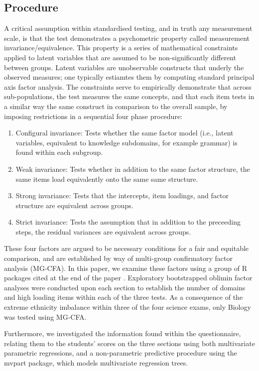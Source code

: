 \documentclass{article}\usepackage[]{graphicx}\usepackage[]{color}
\begin{document}
\subsection{Procedure}
A critical assumption within standardised testing, and in truth any measurement scale, is that the test demonstrates a psychometric property called measurement invariance/equivalence. This property is a series of mathematical constraints applied to latent variables that are assumed to be non-significantly different between groups. Latent variables are unobservable constructs that underly the observed measures; one typically estiamtes them by computing standard principal axis factor analysis. The constraints serve to empirically demonstrate that across sub-populations, the test measures the same concepts, and that each item tests in a similar way the same construct in comparison to the overall sample, by imposing restrictions in a sequential four phase procedure:
\begin{enumerate}
\item{Configural invariance:} 
Tests whether the same factor model (i.e., latent variables, equivalent to knowledge subdomains, for example grammar) is found within each subgroup.
\item{Weak invariance:}
Tests whether in addition to the same factor structure, the same items load equivalently onto the same same structure.
\item{Strong invariance:}
Tests that the intercepts, item loadings, and factor structure are equivalent across groups.
\item{Strict invariance:}
Tests the assumption that in addition to the preceeding steps, the residual variances are equivalent across groups.
\end{enumerate}
These four factors are argued to be necessary conditions for a fair and equitable comparison\cite{Meredith}, and are established by way of multi-group confirmatory factor analysis (MG-CFA). In this paper, we examine these factors using a group of R packages cited at the end of the paper \cite{psych,lavaan,semTools}. 
Exploratory bootstrapped oblimin factor analyses were conducted upon each section to establish the number of domains and high loading items within each of the three tests. As a consequence of the extreme ethnicity imbalance within three of the four science exams, only Biology was tested using MG-CFA.

Furthermore, we investigated the information found within the questionnaire, relating them to the students' scores on the three sections using both multivariate parametric regressions, and a non-parametric predictive procedure using the mvpart package, which models multivariate regression trees.
\end{document}
